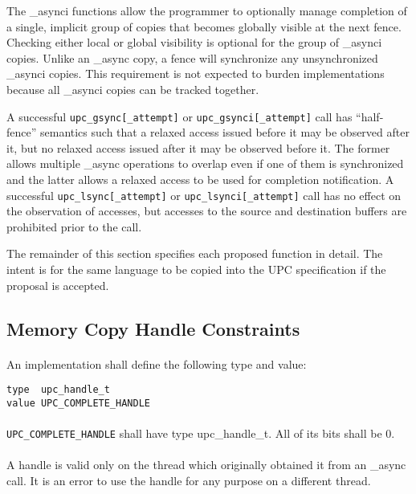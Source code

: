 \documentclass[10pt]{article}
\def \gsync  {{\tt upc\_gsync[\_attempt]}}
\def \gsynci {{\tt upc\_gsynci[\_attempt]}}
\def \lsync  {{\tt upc\_lsync[\_attempt]}}
\def \lsynci {{\tt upc\_lsynci[\_attempt]}}
\def \complete {{\tt UPC\_COMPLETE\_HANDLE}}
\begin{document}
The \_asynci functions allow the programmer to optionally manage completion of a
single, implicit group of copies that becomes globally visible at the next
fence.  Checking either local or global visibility is optional for the group of
\_asynci copies.  Unlike an \_async copy, a fence will synchronize any
unsynchronized \_asynci copies.  This requirement is not expected to burden
implementations because all \_asynci copies can be tracked together.

A successful \gsync{} or \gsynci{} call has ``half-fence'' semantics such that a
relaxed access issued before it may be observed after it, but no relaxed access
issued after it may be observed before it.  The former allows multiple \_async
operations to overlap even if one of them is synchronized and the latter allows
a relaxed access to be used for completion notification.  A successful \lsync{}
or \lsynci{} call has no effect on the observation of accesses, but accesses to
the source and destination buffers are prohibited prior to the call.

The remainder of this section specifies each proposed function in detail.  The
intent is for the same language to be copied into the UPC specification if the
proposal is accepted.

\subsection{Memory Copy Handle Constraints}
\setcounter{secnumdepth}{4}

\paragraph{} An implementation shall define the following type and value:

\begin{verbatim}
type  upc_handle_t
value UPC_COMPLETE_HANDLE
\end{verbatim}

\paragraph{} \complete{} shall have type upc\_handle\_t.  All of its bits shall
be 0.

\paragraph{} A handle is valid only on the thread which originally obtained it
from an \_async call.  It is an error to use the handle for any purpose on a
different thread.
\end{document}
